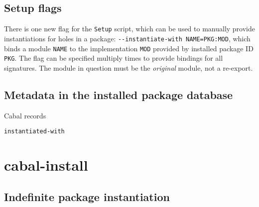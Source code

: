 \documentclass{article}
\begin{document}
\subsection{Setup flags}

There is one new flag for the \texttt{Setup} script, which can be
used to manually provide instantiations for holes in a package:
\verb|--instantiate-with NAME=PKG:MOD|, which binds a module \verb|NAME|
to the implementation \verb|MOD| provided by installed package ID \verb|PKG|.
The flag can be specified multiply times to provide bindings for all
signatures.  The module in question must be the \emph{original} module,
not a re-export.



\subsection{Metadata in the installed package database}

Cabal records

\texttt{instantiated-with}

\section{cabal-install}

\subsection{Indefinite package instantiation}
\end{document}
